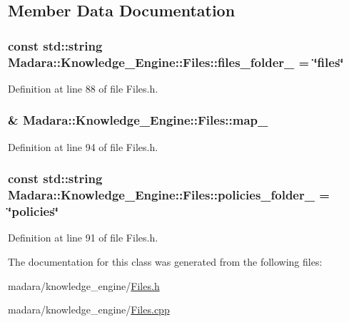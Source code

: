 \subsection{Member Data Documentation}
\hypertarget{classMadara_1_1Knowledge__Engine_1_1Files_a2059e0bb921e2bd4d6b87c242a258e75}{
\subsubsection[{files\_\-folder\_\-}]{\setlength{\rightskip}{0pt plus 5cm}const std::string {\bf Madara::Knowledge\_\-Engine::Files::files\_\-folder\_\-} = \char`\"{}files\char`\"{}}}
\label{d1/dfe/classMadara_1_1Knowledge__Engine_1_1Files_a2059e0bb921e2bd4d6b87c242a258e75}


Definition at line 88 of file Files.h.

\hypertarget{classMadara_1_1Knowledge__Engine_1_1Files_afc3782f34e690175d5c414dd9d4aa25e}{
\subsubsection[{map\_\-}]{\& {\bf Madara::Knowledge\_\-Engine::Files::map\_\-}}}
\label{d1/dfe/classMadara_1_1Knowledge__Engine_1_1Files_afc3782f34e690175d5c414dd9d4aa25e}


Definition at line 94 of file Files.h.

\hypertarget{classMadara_1_1Knowledge__Engine_1_1Files_a866b4e450bec51b106be07193b65676a}{
\subsubsection[{policies\_\-folder\_\-}]{\setlength{\rightskip}{0pt plus 5cm}const std::string {\bf Madara::Knowledge\_\-Engine::Files::policies\_\-folder\_\-} = \char`\"{}policies\char`\"{}}}
\label{d1/dfe/classMadara_1_1Knowledge__Engine_1_1Files_a866b4e450bec51b106be07193b65676a}


Definition at line 91 of file Files.h.



The documentation for this class was generated from the following files:\begin{DoxyCompactItemize}
\item 
madara/knowledge\_\-engine/\hyperlink{Files_8h}{Files.h}\item 
madara/knowledge\_\-engine/\hyperlink{Files_8cpp}{Files.cpp}\end{DoxyCompactItemize}
